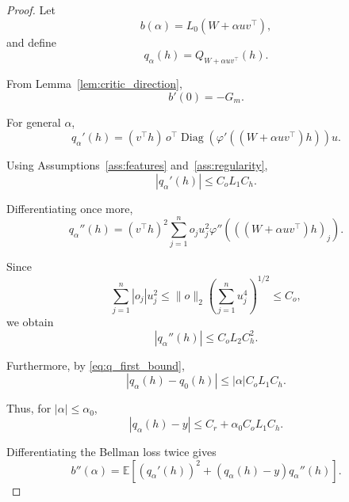\begin{proof}
Let
\begin{equation}
b(\alpha)
=
L_0(W+\alpha uv^\top),
\end{equation}
and define
\begin{equation}
q_\alpha(h)
=
Q_{W+\alpha uv^\top}(h).
\end{equation}

From Lemma~\ref{lem:critic_direction},
\begin{equation}
b'(0)=-G_m.
\end{equation}

For general $\alpha$,
\begin{equation}
q_\alpha'(h)
=
(v^\top h)\,
o^\top
\operatorname{Diag}
\left(
\varphi'((W+\alpha uv^\top)h)
\right)
u.
\end{equation}

Using Assumptions~\ref{ass:features} and~\ref{ass:regularity},
\begin{equation}
|q_\alpha'(h)|
\leq
C_oL_1C_h.
\label{eq:q_first_bound}
\end{equation}

Differentiating once more,
\begin{equation}
q_\alpha''(h)
=
(v^\top h)^2
\sum_{j=1}^{n}
o_ju_j^2
\varphi''
\left(
((W+\alpha uv^\top)h)_j
\right).
\end{equation}

Since
\begin{equation}
\sum_{j=1}^{n}|o_j|u_j^2
\leq
\|o\|_2
\left(
\sum_{j=1}^{n}u_j^4
\right)^{1/2}
\leq
C_o,
\end{equation}
we obtain
\begin{equation}
|q_\alpha''(h)|
\leq
C_oL_2C_h^2.
\label{eq:q_second_bound}
\end{equation}

Furthermore, by \eqref{eq:q_first_bound},
\begin{equation}
|q_\alpha(h)-q_0(h)|
\leq
|\alpha|C_oL_1C_h.
\end{equation}

Thus, for $|\alpha|\leq\alpha_0$,
\begin{equation}
|q_\alpha(h)-y|
\leq
C_r+\alpha_0C_oL_1C_h.
\end{equation}

Differentiating the Bellman loss twice gives
\begin{equation}
b''(\alpha)
=
\mathbb{E}
\left[
(q_\alpha'(h))^2
+
(q_\alpha(h)-y)q_\alpha''(h)
\right].
\end{equation}


\end{proof}
